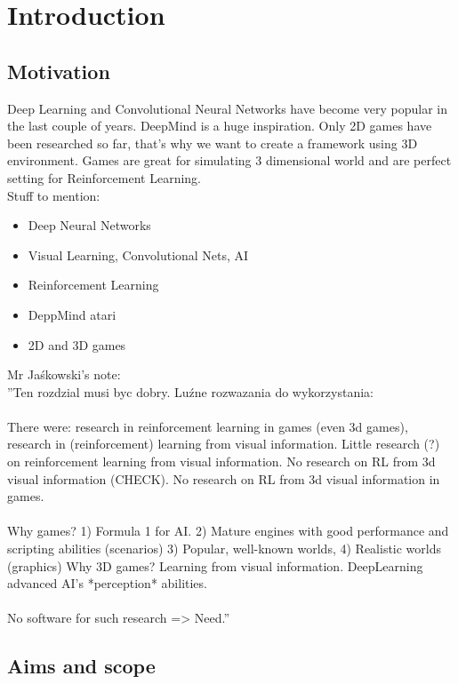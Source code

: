 
\chapter{Introduction}

\section{Motivation}
Deep Learning and Convolutional Neural Networks have become very popular in the last couple of years. DeepMind is a huge inspiration. Only 2D games have been researched so far, that's why we want to create a framework using 3D environment. Games are great for simulating 3 dimensional world and are perfect setting for Reinforcement Learning.\\
Stuff to mention:
\begin{itemize}
	\item Deep Neural Networks
	\item Visual Learning, Convolutional Nets, AI
	\item Reinforcement Learning
	\item DeppMind atari
	\item 2D and 3D games
\end{itemize}

Mr Jaśkowski's note:\\
''Ten rozdzial musi byc dobry. Luźne rozwazania do wykorzystania:\\
\\
There were: research in reinforcement learning in games (even 3d games), research in (reinforcement) learning from visual information. Little research (?) on reinforcement learning from visual information. No research on RL from 3d visual information (CHECK). No research on RL from 3d visual information in games.\\
\\
Why games? 1) Formula 1 for AI.  2) Mature engines with good performance and scripting abilities (scenarios) 3) Popular, well-known worlds, 4) Realistic worlds (graphics)
Why 3D games? Learning from visual information. DeepLearning advanced AI’s *perception* abilities.\\
\\
No software for such research => Need.''

\section{Aims and scope}

